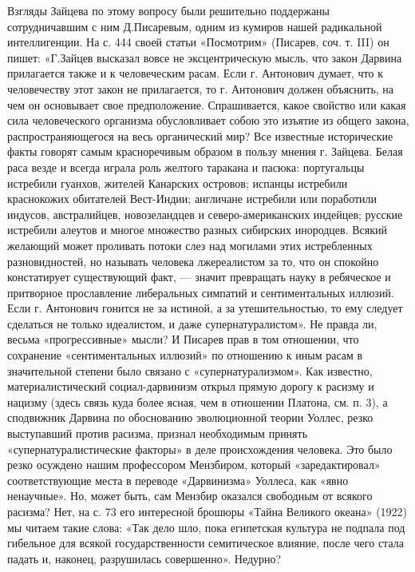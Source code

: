 Взгляды   Зайцева  по   этому  вопросу   были  решительно   поддержаны
сотрудничавшим с  ним Д.Писаревым, одним из  кумиров нашей радикальной
интеллигенции. На  с. 444 своей  статьи «Посмотрим» (Писарев,  соч. т.
III) он пишет: «Г.Зайцев высказал  вовсе не эксцентрическую мысль, что
закон  Дарвина  прилагается также  и  к  человеческим расам.  Если  г.
Антонович думает, что к человечеству  этот закон не прилагается, то г.
Антонович должен  объяснить, на чем он  основывает свое предположение.
Спрашивается, какое  свойство или  какая сила  человеческого организма
обусловливает собою это изъятие  из общего закона, распространяющегося
на  весь органический  мир? Все  известные исторические  факты говорят
самым красноречивым  образом в  пользу мнения  г. Зайцева.  Белая раса
везде  и всегда  играла роль  желтого таракана  и пасюка:  португальцы
истребили  гуанхов,  жителей  Канарских  островов;  испанцы  истребили
краснокожих обитателей Вест-Индии;  англичане истребили или поработили
индусов, австралийцев,  новозеландцев и  северо-американских индейцев;
русские  истребили   алеутов  и  многое  множество   разных  сибирских
инородцев. Всякий  желающий может  проливать потоки слез  над могилами
этих истребленных разновидностей, но называть человека лжереалистом за
то,  что  он  спокойно  констатирует  существующий  факт,  ---  значит
превращать науку  в ребяческое  и притворное  прославление либеральных
симпатий  и   сентиментальных  иллюзий.  Если  г.   Антонович  гонится
не  за  истиной,  а  за  утешительностью,  то  ему  следует  сделаться
не  только  идеалистом,  и  даже  супернатуралистом».  Не  правда  ли,
весьма  «прогрессивные» мысли?  И Писарев  прав в  том отношении,  что
сохранение  «сентиментальных  иллюзий»  по   отношению  к  иным  расам
в  значительной  степени  было   связано  с  «супернатурализмом».  Как
известно, материалистический  социал-дарвинизм открыл прямую  дорогу к
расизму  и нацизму  (здесь связь  куда  более ясная,  чем в  отношении
Платона, см. п.  3), а сподвижник Дарвина  по обоснованию эволюционной
теории Уоллес,  резко выступавший против расизма,  признал необходимым
принять   «супернатуралистические   факторы»  в   деле   происхождения
человека.  Это  было  резко   осуждено  нашим  профессором  Мензбиром,
который «заредактировал» соответствующие места в переводе «Дарвинизма»
Уоллеса, как  «явно ненаучные». Но,  может быть, сам  Мензбир оказался
свободным от  всякого расизма?  Нет, на с.  73 его  интересной брошюры
«Тайна  Великого  океана» (1922)  мы  читаем  такие слова:  «Так  дело
шло,  пока египетская  культура не  подпала под  гибельное для  всякой
государственности  семитическое влияние,  после чего  стала падать  и,
наконец, разрушилась совершенно». Недурно?

